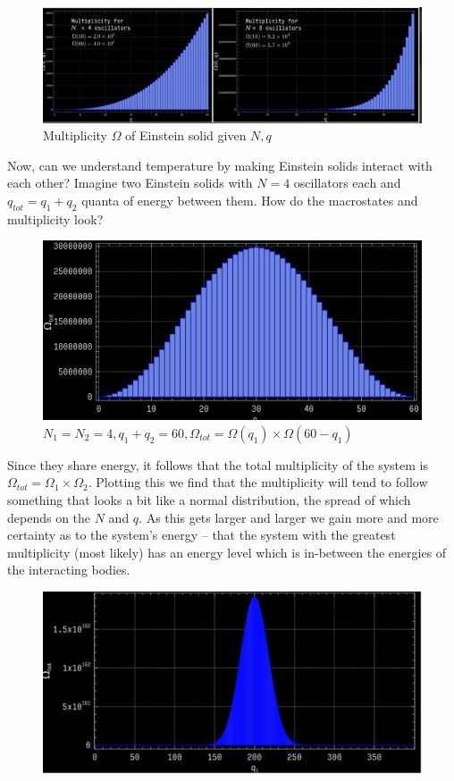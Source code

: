\documentclass[10pt]{article}
\begin{document}
\begin{figure}[H]
	\centering
	\includegraphics[width=\linewidth]{img/image_2022-03-07-12-31-52.png}
	\caption{Multiplicity $ \Omega $ of Einstein solid given $ N, q $ }
\end{figure}

Now, can we understand temperature by making Einstein solids interact with each other?
Imagine two Einstein solids with $ N = 4 $  oscillators each and $ q_{tot} = q_1 + q_2$  quanta of energy between them.
How do the macrostates and multiplicity look?


\begin{figure}[H]
	\centering
	\includegraphics[width=0.8\linewidth]{img/image_2022-03-07-12-39-42.png}
	\caption{$ N_1 = N_2 = 4, q_1 + q_2 = 60, \Omega_{tot} = \Omega(q_1) \times \Omega(60 - q_1)$ }
\end{figure}

Since they share energy, it follows that the total multiplicity of the system is  $ \Omega_{tot} = \Omega_1 \times \Omega_2 $. 
Plotting this we find that the multiplicity will tend to follow something that looks a bit like a normal distribution, the spread of which depends on the $ N $  and $ q $. 
As this gets larger and larger we gain more and more certainty as to the system's energy -- that the system with the greatest multiplicity (most likely) has an energy level which is in-between the energies of the interacting bodies.


\begin{figure}[H]
	\centering
	\includegraphics[width=0.8\linewidth]{img/image_2022-03-07-12-44-29.png}
\end{figure}
\end{document}
